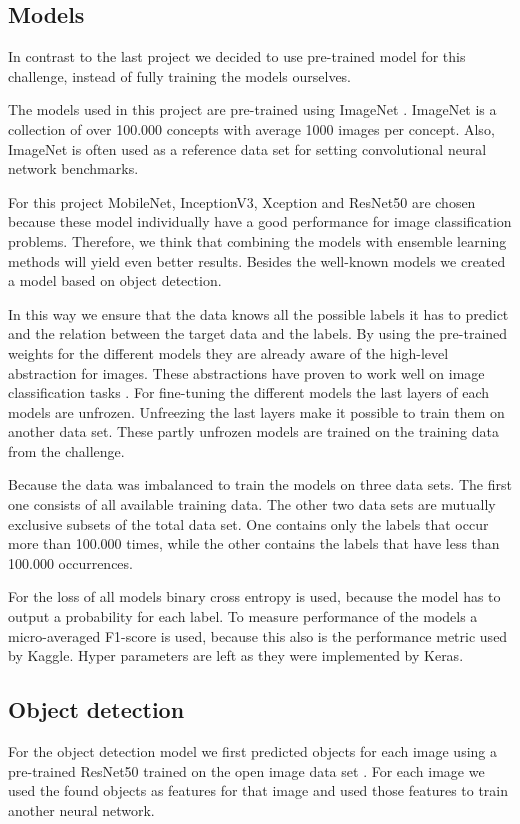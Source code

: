 \documentclass[10pt, a4paper]{article}
\begin{document}
\begin{multicols}{2}
		\section{Models}
		In contrast to the last project we decided to use pre-trained model for this challenge, instead of fully training the models ourselves. 
		
		The models used in this project are pre-trained using ImageNet \cite{deng2009imagenet}. ImageNet is a collection of over 100.000 concepts with average 1000 images per concept. Also, ImageNet is often used as a reference data set for setting convolutional neural network benchmarks.
		
		For this project MobileNet, InceptionV3, Xception and ResNet50 are chosen because these model individually have a good performance for image classification problems. Therefore, we think that combining the models with ensemble learning methods will yield even better results. Besides the well-known models we created a model based on object detection.
		
		In this way we ensure that the data knows all the possible labels it has to predict and the relation between the target data and the labels. By using the pre-trained weights for the different models they are already aware of the high-level abstraction for images. These abstractions have proven to work well on image classification tasks \cite{razavian2014cnn}.
		For fine-tuning the different models the last layers of each models are unfrozen. Unfreezing the last layers make it possible to train them on another data set. These partly unfrozen models are trained on the training data from the challenge.
		
		Because the data was imbalanced to train the models on three data sets. The first one consists of all available training data. The other two data sets are mutually exclusive subsets of the total data set. One contains only the labels that occur more than 100.000 times, while the other contains the labels that have less than 100.000 occurrences.
		
		For the loss of all models binary cross entropy is used, because the model has to output a probability for each label. To measure performance of the models a micro-averaged F1-score is used, because this also is the performance metric used by Kaggle. Hyper parameters are left as they were implemented by Keras.
		
		\subsection{Object detection}
		For the object detection model we first predicted objects for each image using a pre-trained ResNet50 \cite{DBLP:journals/corr/HeZRS15} trained on the open image data set \cite{openimages}. For each image we used the found objects as features for that image and used those features to train another neural network. 
		

\end{multicols}
\end{document}
